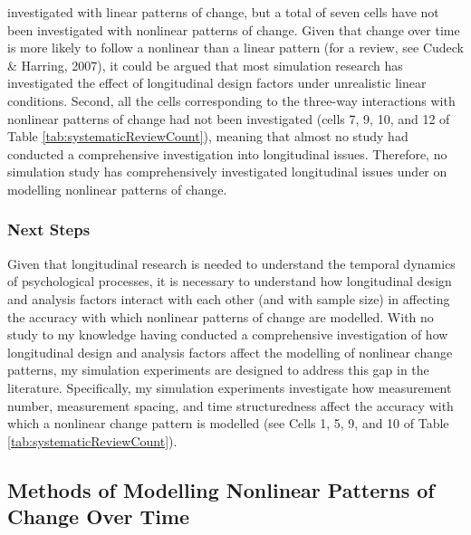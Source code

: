 \documentclass[
  english,
  man,floatsintext]{apa7}
\begin{document}
\noindent investigated with linear patterns of change, but a total of seven cells have not been investigated with nonlinear patterns of change. Given that change over time is more likely to follow a nonlinear than a linear pattern (for a review, see Cudeck \& Harring, 2007), it could be argued that most simulation research has investigated the effect of longitudinal design factors under unrealistic linear conditions. Second, all the cells corresponding to the three-way interactions with nonlinear patterns of change had not been investigated (cells 7, 9, 10, and 12 of Table \ref{tab:systematicReviewCount}), meaning that almost no study had conducted a comprehensive investigation into longitudinal issues. Therefore, no simulation study has comprehensively investigated longitudinal issues under on modelling nonlinear patterns of change.

\hypertarget{next-steps}{%
\subsubsection{Next Steps}\label{next-steps}}

Given that longitudinal research is needed to understand the temporal dynamics of psychological processes, it is necessary to understand how longitudinal design and analysis factors interact with each other (and with sample size) in affecting the accuracy with which nonlinear patterns of change are modelled. With no study to my knowledge having conducted a comprehensive investigation of how longitudinal design and analysis factors affect the modelling of nonlinear change patterns, my simulation experiments are designed to address this gap in the literature. Specifically, my simulation experiments investigate how measurement number, measurement spacing, and time structuredness affect the accuracy with which a nonlinear change pattern is modelled (see Cells 1, 5, 9, and 10 of Table \ref{tab:systematicReviewCount}).

\hypertarget{methods-of-modelling-nonlinear-patterns-of-change-over-time}{%
\subsection{Methods of Modelling Nonlinear Patterns of Change Over Time}\label{methods-of-modelling-nonlinear-patterns-of-change-over-time}}
\end{document}
